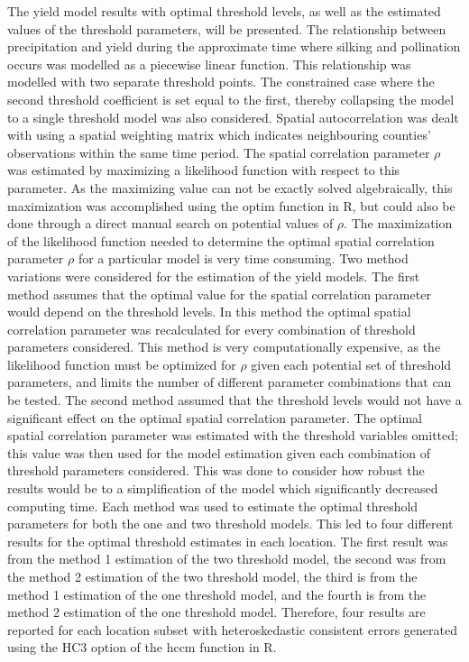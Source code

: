 The yield model results with optimal threshold levels, as well as the estimated values of the threshold parameters, will be presented. The relationship between precipitation and yield during the approximate time where silking and pollination occurs was modelled  as a piecewise linear function. This relationship was modelled with two separate threshold points. The constrained case where the second threshold coefficient is set equal to the first, thereby collapsing the model to a single threshold model was also considered. Spatial autocorrelation was dealt with using a spatial weighting matrix which indicates neighbouring counties' observations within the same time period. The spatial correlation parameter $\rho$ was estimated by maximizing a likelihood function with respect to this parameter. As the maximizing value can not be exactly solved algebraically, this maximization was accomplished using the optim function in R, but could also be done through a direct manual search on potential values of $\rho$. The maximization of the likelihood function needed to determine the optimal spatial correlation parameter $\rho$ for a particular model is very time consuming. Two method variations were considered for the estimation of the yield models. The first method assumes that the optimal value for the spatial correlation parameter would depend on the threshold levels. In this method the optimal spatial correlation parameter was recalculated for every combination of threshold parameters considered. This method is very computationally expensive, as the likelihood function must be optimized for $\rho$ given each potential set of threshold parameters, and limits the number of different parameter combinations that can be tested. The second method assumed that the threshold levels would not have a significant effect on the optimal spatial correlation parameter. The optimal spatial correlation parameter was estimated with the threshold variables omitted; this value was then used for the model estimation given each combination of threshold parameters considered. This was done to consider how robust the results would be to a simplification of the model which significantly decreased computing time. Each method was used to estimate the optimal threshold parameters for both the one and two threshold models. This led to four different results for the optimal threshold estimates in each location. The first result was from the method 1 estimation of the two threshold model, the second was from the method 2 estimation of the two threshold model, the third is from the method 1 estimation of the one threshold model, and the fourth is from the method 2 estimation of the one threshold model. Therefore, four results are reported for each location subset with heteroskedastic consistent errors generated using the HC3 option of the hccm function in R. 


